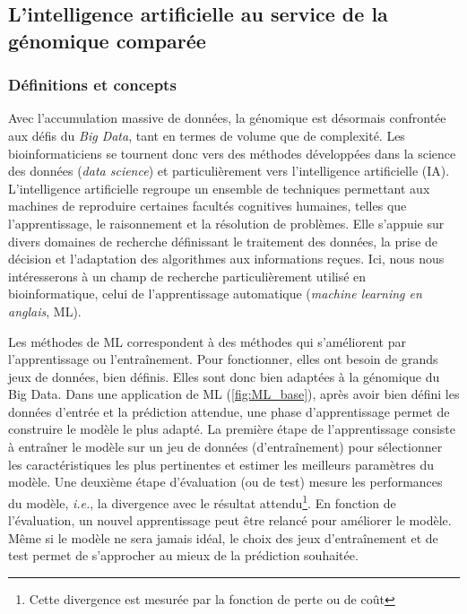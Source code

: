 \subsection{L'intelligence artificielle au service de la génomique comparée}

\subsubsection{Définitions et concepts}

Avec l’accumulation massive de données, la génomique est désormais confrontée aux défis du \textit{Big Data}, tant en termes de volume que de complexité. Les bioinformaticiens se tournent donc vers des méthodes développées dans la science des données (\textit{data science}) et particulièrement vers l'intelligence artificielle (IA). L’intelligence artificielle regroupe un ensemble de techniques permettant aux machines de reproduire certaines facultés cognitives humaines, telles que l’apprentissage, le raisonnement et la résolution de problèmes. Elle s’appuie sur divers domaines de recherche définissant le traitement des données, la prise de décision et l’adaptation des algorithmes aux informations reçues. Ici, nous nous intéresserons à un champ de recherche particulièrement utilisé en bioinformatique, celui de l'apprentissage automatique (\textit{machine learning en anglais}, ML). 

Les méthodes de ML correspondent à des méthodes qui s'améliorent par l'apprentissage ou l'entraînement. Pour fonctionner, elles ont besoin de grands jeux de données, bien définis. Elles sont donc bien adaptées à la génomique du Big Data. Dans une application de ML (\autoref{fig:ML_base}), après avoir bien défini les données d'entrée et la prédiction attendue, une phase d'apprentissage permet de construire le modèle le plus adapté. La première étape de l'apprentissage consiste à entraîner le modèle sur un jeu de données (d’entraînement) pour sélectionner les caractéristiques les plus pertinentes et estimer les meilleurs paramètres du modèle. Une deuxième étape d'évaluation (ou de test) mesure les performances du modèle, \textit{i.e.}, la divergence avec le résultat attendu\footnote{Cette divergence est mesurée par la fonction de perte ou de coût}. En fonction de l'évaluation, un nouvel apprentissage peut être relancé pour améliorer le modèle. Même si le modèle ne sera jamais idéal, le choix des jeux d’entraînement et de test permet de s'approcher au mieux de la prédiction souhaitée. 


